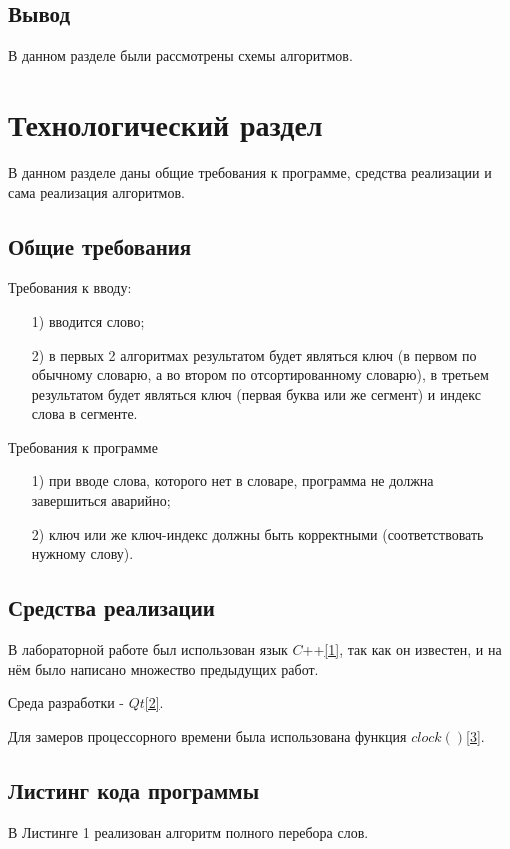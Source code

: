 \documentclass[14pt, a4paper]{extarticle}
\begin{document}
	\subsection*{Вывод}
	В данном разделе были рассмотрены схемы алгоритмов.
	\newpage
	
	\section{Технологический раздел}
	В данном разделе даны общие требования к программе, средства реализации и сама реализация алгоритмов.
	
	\subsection{Общие требования}
	Требования к вводу:
	\begin{enumerate}
		\item[1)] вводится слово;
		\item[2)] в первых 2 алгоритмах результатом будет являться ключ (в первом по обычному словарю, а во втором по отсортированному словарю), в третьем результатом будет являться ключ (первая буква или же сегмент) и индекс слова в сегменте. 
	\end{enumerate}\par
	Требования к программе
	\begin{enumerate}
		\item[1)] при вводе слова, которого нет в словаре, программа не должна завершиться аварийно;
		\item[2)] ключ или же ключ-индекс должны быть корректными (соответствовать нужному слову).
	\end{enumerate}\par

	\subsection{Средства реализации}
	В лабораторной работе был использован язык $C$++\hyperref[CPlusPlus]{[1]}, так как он известен, и на нём было написано множество предыдущих работ.
	
	Среда разработки - $Qt$\hyperref[Cute]{[2]}.
	
	Для замеров процессорного времени была использована функция $clock()$\hyperref[CLOCK]{[3]}.
	\newpage
	
	\subsection{Листинг кода программы}
	В Листинге 1 реализован алгоритм полного перебора слов.
	
\end{document}
